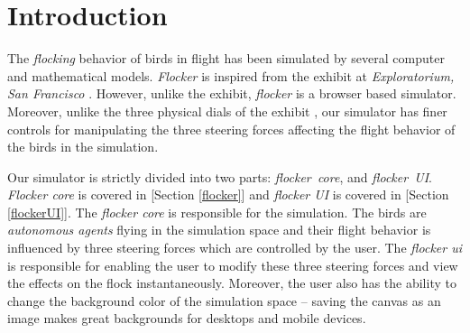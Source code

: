 \documentclass[../main]{subfiles}
\begin{document}
\section{Introduction}
\label{intro}

The {\em flocking} behavior of birds in flight has been simulated by several computer and mathematical models. {\em Flocker} is inspired from the exhibit at {\em Exploratorium, San Francisco} \cite{jillflock}. However, unlike the exhibit, {\em flocker} is a browser based simulator. Moreover, unlike the three physical dials of the exhibit \cite{jillflock}, our simulator has finer controls for manipulating the three steering forces affecting the flight behavior of the birds in the simulation.

Our simulator is strictly divided into two parts: \mbox{\em flocker core}, and \mbox{\em flocker UI}. {\em Flocker core} is covered in [Section \ref{flocker}] and {\em flocker UI} is covered in [Section \ref{flockerUI}]. The {\em flocker core} is responsible for the simulation. The birds are {\em autonomous agents} flying in the simulation space and their flight behavior is influenced by three steering forces which are controlled by the user. The {\em flocker ui} is responsible for enabling the user to modify these three steering forces and view the effects on the flock instantaneously. Moreover, the user also has the ability to change the background color of the simulation space -- saving the canvas as an image makes great backgrounds for desktops and mobile devices.
\end{document}
